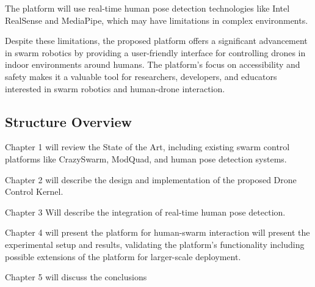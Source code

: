 The platform will use real-time human pose detection technologies like Intel RealSense and MediaPipe, which may have limitations in complex environments.

Despite these limitations, the proposed platform offers a significant advancement in swarm robotics by providing a user-friendly interface for controlling drones in indoor environments around humans. The platform's focus on accessibility and safety makes it a valuable tool for researchers, developers, and educators interested in swarm robotics and human-drone interaction.

\subsection{Structure Overview}
    Chapter 1 will review the State of the Art, including existing swarm control platforms like CrazySwarm, ModQuad, and human pose detection systems.

    Chapter 2 will describe the design and implementation of the proposed Drone Control Kernel.

    Chapter 3 Will describe the integration of real-time human pose detection.

    Chapter 4 will present the platform for human-swarm interaction will present the experimental setup and results, validating the platform's functionality including possible extensions of the platform for larger-scale deployment.

    Chapter 5 will discuss the conclusions




